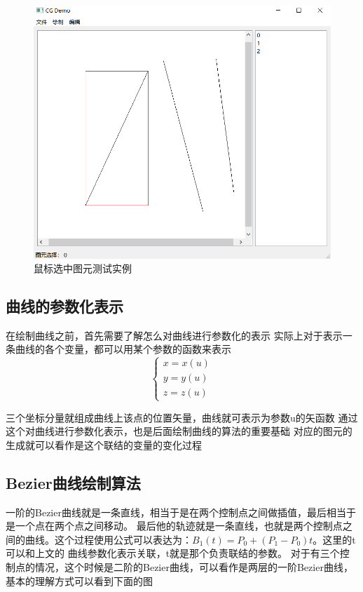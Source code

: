 \documentclass[a4paper,UTF8]{article}
\theoremstyle{definition}
\begin{document}
\begin{figure}[htbp]
{\begin{minipage}{7cm}
        \includegraphics[scale=0.2]{figure/choose2.png}   %
        \end{minipage}
    }
     
    \caption{鼠标选中图元测试实例} %
    \label{fig:1}  %
\end{figure}

\subsection{曲线的参数化表示}
在绘制曲线之前，首先需要了解怎么对曲线进行参数化的表示
实际上对于表示一条曲线的各个变量，都可以用某个参数的函数来表示
$$
\begin{cases}
    x=x(u)\\
    y=y(u)\\
    z=z(u)
\end{cases}
$$

三个坐标分量就组成曲线上该点的位置矢量，曲线就可表示为参数u的矢函数
通过这个对曲线进行参数化表示，也是后面绘制曲线的算法的重要基础
对应的图元的生成就可以看作是这个联结的变量的变化过程

\subsection{Bezier曲线绘制算法}
一阶的Bezier曲线就是一条直线，相当于是在两个控制点之间做插值，最后相当于是一个点在两个点之间移动。
最后他的轨迹就是一条直线，也就是两个控制点之间的曲线。这个过程使用公式可以表达为：$ B_{1}(t)=P_0+(P_1-P_0) t$。这里的t可以和上文的
曲线参数化表示关联，t就是那个负责联结的参数。
对于有三个控制点的情况，这个时候是二阶的Bezier曲线，可以看作是两层的一阶Bezier曲线，基本的理解方式可以看到下面的图
\end{document}
